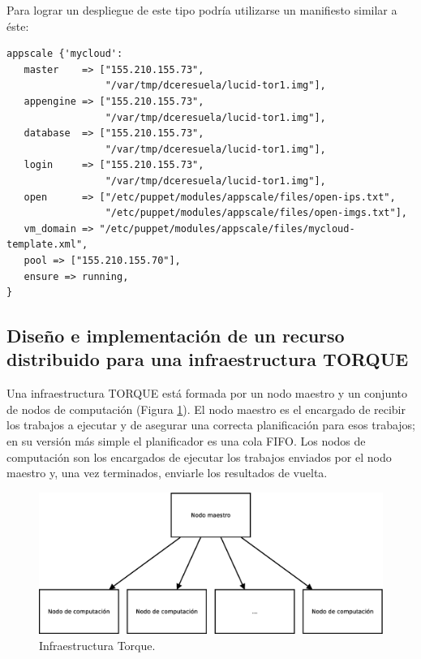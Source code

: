 Para lograr un despliegue de este tipo podría utilizarse un manifiesto similar a éste:

\begin{lstlisting}
appscale {'mycloud':
   master    => ["155.210.155.73",
                 "/var/tmp/dceresuela/lucid-tor1.img"],
   appengine => ["155.210.155.73",
                 "/var/tmp/dceresuela/lucid-tor1.img"],
   database  => ["155.210.155.73",
                 "/var/tmp/dceresuela/lucid-tor1.img"],
   login     => ["155.210.155.73",
                 "/var/tmp/dceresuela/lucid-tor1.img"],
   open      => ["/etc/puppet/modules/appscale/files/open-ips.txt",
                 "/etc/puppet/modules/appscale/files/open-imgs.txt"],
   vm_domain => "/etc/puppet/modules/appscale/files/mycloud-template.xml",
   pool => ["155.210.155.70"],
   ensure => running,
}
\end{lstlisting}


\subsection{Diseño e implementación de un recurso distribuido para una infraestructura TORQUE}

Una infraestructura TORQUE está formada por un nodo maestro y un conjunto de nodos de computación (Figura \ref{figure:arquitectura-torque}). El nodo maestro es el encargado de recibir los trabajos a ejecutar y de asegurar una correcta planificación para esos trabajos; en su versión más simple el planificador es una cola FIFO. Los nodos de computación son los encargados de ejecutar los trabajos enviados por el nodo maestro y, una vez terminados, enviarle los resultados de vuelta. \\

\begin{figure} [!htbp]
  \centering
  \includegraphics[width=13.5cm]{figuras/Arquitectura_Torque.eps}
  \caption{Infraestructura Torque.}
\label{figure:arquitectura-torque}
\end{figure}

